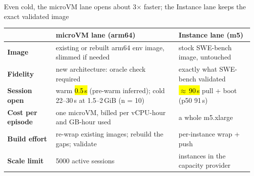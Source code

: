 \begin{frame}{Even cold, the microVM lane opens about 3$\times$ faster; the Instance lane keeps the exact validated image}
\scriptsize
\begin{tabularx}{\textwidth}{@{}>{\bfseries}p{2.6cm}XX@{}}
\toprule
 & \textbf{microVM lane (arm64)} & \textbf{Instance lane (m5)}\\
\midrule
Image & existing or rebuilt arm64 env image, slimmed if needed & stock SWE-bench image, untouched\\
Fidelity & new architecture: oracle check required & exactly what SWE-bench validated\\
Session open & warm \hl{0.5\,s} (pre-warm inferred); cold 22--30\,s at 1.5--2\,GiB (n = 10) & \hl{$\approx$\,90\,s} pull + boot (p50 91\,s)\\
Cost per episode & one microVM, billed per vCPU-hour and GB-hour used & a whole m5.xlarge\\
Build effort & re-wrap existing images; rebuild the gaps; validate & per-instance wrap + push\\
Scale limit & 5000 active sessions & instances in the capacity provider\\
\bottomrule
\end{tabularx}
\end{frame}


